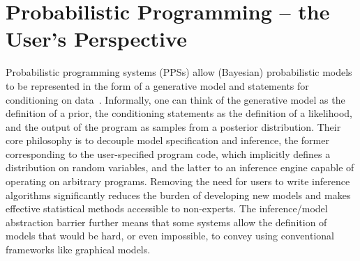 
\chapter{Probabilistic Programming -- the User's Perspective}
\label{chp:probprog}

Probabilistic programming systems (PPSs) allow (Bayesian) probabilistic models to be represented in the 
form of a generative model and statements for conditioning on data~\citep{gordon2014probabilistic,goodman2008church}.  
Informally, one can think of the generative model as the definition of a prior, the conditioning 
statements as the definition of a likelihood, and the output of the program as samples from a posterior distribution. 
Their core philosophy is to decouple model specification and inference, the former 
corresponding to the user-specified program code, which implicitly 
defines a distribution on random variables, and the latter to an inference engine 
capable of operating on arbitrary programs.  Removing the need for users to write 
inference algorithms significantly reduces the burden of developing new models and 
makes effective statistical methods accessible to non-experts.  The inference/model abstraction barrier 
further means that some systems allow the definition of models that would be hard, or
even impossible, to convey using conventional frameworks like graphical models.


